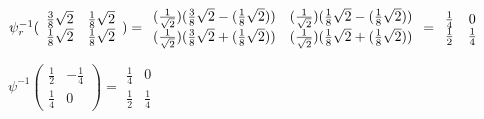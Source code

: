 \documentclass{article}
\begin{document}
$\psi _{r}^{-1}(\allowbreak 
\begin{array}{cc}
\frac{3}{8}\sqrt{2} & \frac{1}{8}\sqrt{2} \\ 
\frac{1}{8}\sqrt{2} & \frac{1}{8}\sqrt{2}
\end{array}
)=
\begin{array}{cc}
(\frac{1}{\sqrt{2}})(\frac{3}{8}\sqrt{2}-(\frac{1}{8}\sqrt{2})) & (\frac{1}{%
\sqrt{2}})(\frac{1}{8}\sqrt{2}-(\frac{1}{8}\sqrt{2})) \\ 
(\frac{1}{\sqrt{2}})(\frac{3}{8}\sqrt{2}+(\frac{1}{8}\sqrt{2})) & (\frac{1}{%
\sqrt{2}})(\frac{1}{8}\sqrt{2}+(\frac{1}{8}\sqrt{2}))
\end{array}
=\allowbreak 
\begin{array}{cc}
\frac{1}{4} & 0 \\ 
\frac{1}{2} & \frac{1}{4}
\end{array}
$

$\psi ^{-1}(\allowbreak 
\begin{array}{cc}
\frac{1}{2} & -\frac{1}{4} \\ 
\frac{1}{4} & 0
\end{array}
)=\allowbreak 
\begin{array}{cc}
\frac{1}{4} & 0 \\ 
\frac{1}{2} & \frac{1}{4}
\end{array}
$
\end{document}
